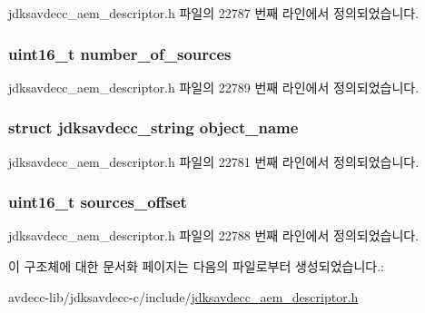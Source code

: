 jdksavdecc\+\_\+aem\+\_\+descriptor.\+h 파일의 22787 번째 라인에서 정의되었습니다.

\subsubsection[{\texorpdfstring{number\+\_\+of\+\_\+sources}{number_of_sources}}]{\setlength{\rightskip}{0pt plus 5cm}uint16\+\_\+t number\+\_\+of\+\_\+sources}\hypertarget{structjdksavdecc__descriptor__signal__multiplexer_a1af3a7f3729937d5da218737ba5b2483}{}\label{structjdksavdecc__descriptor__signal__multiplexer_a1af3a7f3729937d5da218737ba5b2483}


jdksavdecc\+\_\+aem\+\_\+descriptor.\+h 파일의 22789 번째 라인에서 정의되었습니다.

\subsubsection[{\texorpdfstring{object\+\_\+name}{object_name}}]{\setlength{\rightskip}{0pt plus 5cm}struct {\bf jdksavdecc\+\_\+string} object\+\_\+name}\hypertarget{structjdksavdecc__descriptor__signal__multiplexer_a7d1f5945a13863b1762fc6db74fa8f80}{}\label{structjdksavdecc__descriptor__signal__multiplexer_a7d1f5945a13863b1762fc6db74fa8f80}


jdksavdecc\+\_\+aem\+\_\+descriptor.\+h 파일의 22781 번째 라인에서 정의되었습니다.

\subsubsection[{\texorpdfstring{sources\+\_\+offset}{sources_offset}}]{\setlength{\rightskip}{0pt plus 5cm}uint16\+\_\+t sources\+\_\+offset}\hypertarget{structjdksavdecc__descriptor__signal__multiplexer_ac9ce4e1b642e6654d49504898dbe738d}{}\label{structjdksavdecc__descriptor__signal__multiplexer_ac9ce4e1b642e6654d49504898dbe738d}


jdksavdecc\+\_\+aem\+\_\+descriptor.\+h 파일의 22788 번째 라인에서 정의되었습니다.



이 구조체에 대한 문서화 페이지는 다음의 파일로부터 생성되었습니다.\+:\begin{DoxyCompactItemize}
\item 
avdecc-\/lib/jdksavdecc-\/c/include/\hyperlink{jdksavdecc__aem__descriptor_8h}{jdksavdecc\+\_\+aem\+\_\+descriptor.\+h}\end{DoxyCompactItemize}
